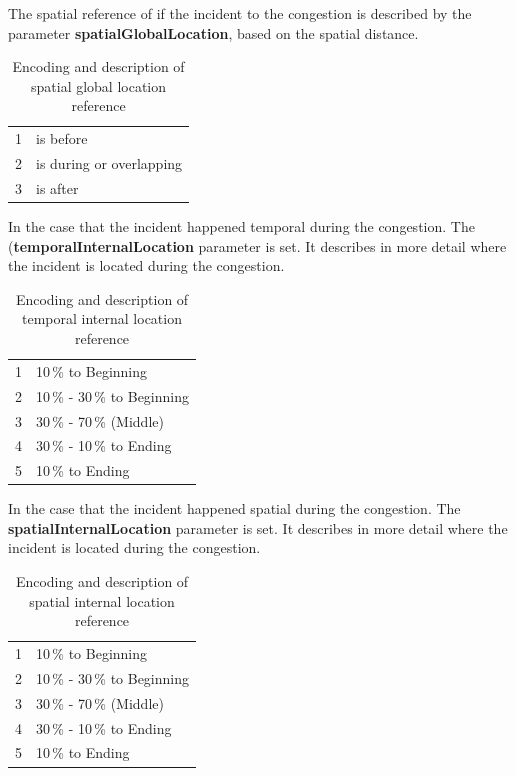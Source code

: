 The spatial reference of if the incident to the congestion is described by the parameter \textbf{spatialGlobalLocation}, based on the spatial distance.
\begin{table}[ht]
	\centering
	\begin{tabular}{c|l}  
		1 & is before \\ 
 		2 & is during or overlapping \\ 
 		3 & is after \\ 
	\end{tabular}
	\caption{Encoding and description of spatial global location reference}
	\vspace{-4mm}
\end{table}

In the case that the incident happened temporal  during the congestion. The (\textbf{temporalInternalLocation} parameter is set. It describes in more detail where the incident is located during the congestion.
\begin{table}[ht]
	\centering
	\begin{tabular}{c|l}  
		1 & 10\,\% to Beginning \\
 		2 & 10\,\% - 30\,\% to Beginning \\
 		3 & 30\,\% - 70\,\% (Middle) \\
 		4 & 30\,\% - 10\,\% to Ending \\
 		5 & 10\,\% to Ending \\
	\end{tabular}
	\caption{Encoding and description of temporal internal location reference}
	\vspace{-4mm}
\end{table}

In the case that the incident happened spatial during the congestion. The \textbf{spatialInternalLocation} parameter is set. It describes in more detail where the incident is located during the congestion.
\begin{table}[ht]
	\centering
	\begin{tabular}{c|l}  
		1 & 10\,\% to Beginning \\
 		2 & 10\,\% - 30\,\% to Beginning \\
 		3 & 30\,\% - 70\,\% (Middle) \\
 		4 & 30\,\% - 10\,\% to Ending \\
 		5 & 10\,\% to Ending \\
	\end{tabular}
	\caption{Encoding and description of spatial internal location reference}
	\vspace{-4mm}
\end{table}
    

